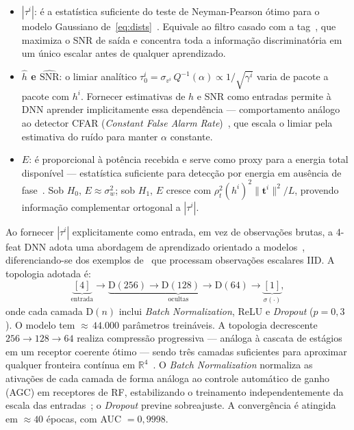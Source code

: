 \documentclass{sbrt}
\begin{document}
\begin{itemize}
  \item \textbf{$|\tau^i|$}: é a estatística suficiente do teste de Neyman-Pearson ótimo para o modelo Gaussiano de~\eqref{eq:dists}~\cite{ref_poor}. Equivale ao filtro casado com a tag~\cite{ref_proakis}, que maximiza o SNR de saída e concentra toda a informação discriminatória em um único escalar antes de qualquer aprendizado.
  \item \textbf{$\hat{h}$ e $\widehat{\text{SNR}}$}: o limiar analítico $\tau_0^i = \sigma_{v^i}\,Q^{-1}(\alpha) \propto 1/\sqrt{\gamma^i}$ varia de pacote a pacote com $h^i$. Fornecer estimativas de $h$ e SNR como entradas permite à DNN aprender implicitamente essa dependência — comportamento análogo ao detector CFAR (\textit{Constant False Alarm Rate})~\cite{ref_poor}, que escala o limiar pela estimativa do ruído para manter $\alpha$ constante.
  \item \textbf{$E$}: é proporcional à potência recebida e serve como proxy para a energia total disponível — estatística suficiente para detecção por energia em ausência de fase~\cite{ref_poor}. Sob $H_0$, $E \approx \sigma_w^2$; sob $H_1$, $E$ cresce com $\rho_t^2(h^i)^2 \|\mathbf{t}^i\|^2 / L$, provendo informação complementar ortogonal a $|\tau^i|$.
\end{itemize}

Ao fornecer $|\tau^i|$ explicitamente como entrada, em vez de observações brutas, a 4-feat DNN adota uma abordagem de aprendizado orientado a modelos~\cite{ref_shlezinger}, diferenciando-se dos exemplos de~\cite{ref_braca} que processam observações escalares IID. A topologia adotada é:
\begin{equation}\label{eq:arch}
\underbrace{[4]}_{\text{entrada}}\!\to\!\underbrace{\text{D}(256)\!\to\!\text{D}(128)\!\to\!\text{D}(64)}_{\text{ocultas}}\!\to\!\underbrace{[1]}_{\sigma(\cdot)},
\end{equation}
onde cada camada D$(n)$ inclui \textit{Batch Normalization}, ReLU e \textit{Dropout} ($p = 0{,}3$). O modelo tem ${\approx}\,44{.}000$ parâmetros treináveis. A topologia decrescente $256\!\to\!128\!\to\!64$ realiza compressão progressiva — análoga à cascata de estágios em um receptor coerente ótimo — sendo três camadas suficientes para aproximar qualquer fronteira contínua em $\mathbb{R}^4$~\cite{ref_goodfellow}. O \textit{Batch Normalization} normaliza as ativações de cada camada de forma análoga ao controle automático de ganho (AGC) em receptores de RF, estabilizando o treinamento independentemente da escala das entradas~\cite{ref_goodfellow}; o \textit{Dropout} previne sobreajuste. A convergência é atingida em $\approx\!40$ épocas, com AUC $= 0{,}9998$.
\end{document}
